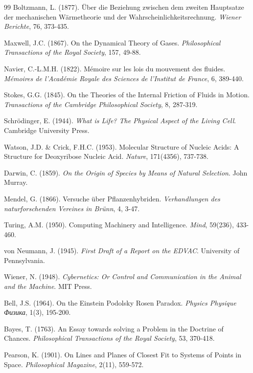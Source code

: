 \documentclass[12pt,a4paper]{article}
\begin{document}
\begin{thebibliography}{99}
Boltzmann, L. (1877). Über die Beziehung zwischen dem zweiten Hauptsatze der mechanischen Wärmetheorie und der Wahrscheinlichkeitsrechnung. \textit{Wiener Berichte}, 76, 373-435.

Maxwell, J.C. (1867). On the Dynamical Theory of Gases. \textit{Philosophical Transactions of the Royal Society}, 157, 49-88.

Navier, C.-L.M.H. (1822). Mémoire sur les lois du mouvement des fluides. \textit{Mémoires de l'Académie Royale des Sciences de l'Institut de France}, 6, 389-440.

Stokes, G.G. (1845). On the Theories of the Internal Friction of Fluids in Motion. \textit{Transactions of the Cambridge Philosophical Society}, 8, 287-319.

Schrödinger, E. (1944). \textit{What is Life? The Physical Aspect of the Living Cell}. Cambridge University Press.

Watson, J.D. \& Crick, F.H.C. (1953). Molecular Structure of Nucleic Acids: A Structure for Deoxyribose Nucleic Acid. \textit{Nature}, 171(4356), 737-738.

Darwin, C. (1859). \textit{On the Origin of Species by Means of Natural Selection}. John Murray.

Mendel, G. (1866). Versuche über Pflanzenhybriden. \textit{Verhandlungen des naturforschenden Vereines in Brünn}, 4, 3-47.

Turing, A.M. (1950). Computing Machinery and Intelligence. \textit{Mind}, 59(236), 433-460.

von Neumann, J. (1945). \textit{First Draft of a Report on the EDVAC}. University of Pennsylvania.

Wiener, N. (1948). \textit{Cybernetics: Or Control and Communication in the Animal and the Machine}. MIT Press.

Bell, J.S. (1964). On the Einstein Podolsky Rosen Paradox. \textit{Physics Physique Физика}, 1(3), 195-200.

Bayes, T. (1763). An Essay towards solving a Problem in the Doctrine of Chances. \textit{Philosophical Transactions of the Royal Society}, 53, 370-418.

Pearson, K. (1901). On Lines and Planes of Closest Fit to Systems of Points in Space. \textit{Philosophical Magazine}, 2(11), 559-572.


\end{thebibliography}
\end{document}
